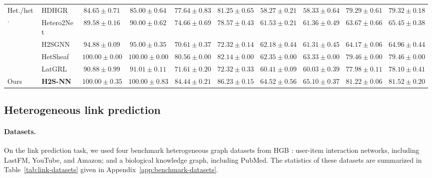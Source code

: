 \documentclass[sigconf,anonymous,review]{acmart}
\newcommand{\method}{\textsc{H2S-NN}}
\begin{document}
\begin{table}[t]
{\begin{tabular}{llcccccccc}
    \multirow{5}{*}{Het./het.}
    & HDHGR
    & $84.65 \pm 0.71$
    & $85.00 \pm 0.64$
    & $77.64 \pm 0.83$
    & $81.25 \pm 0.65$
    & $58.27 \pm 0.21$
    & $58.33 \pm 0.64$
    & $79.29 \pm 0.61$
    & $79.32 \pm 0.18$ \\

    & Hetero2Net
    & $89.58 \pm 0.16$
    & $90.00 \pm 0.62$
    & $74.66 \pm 0.69$
    & $78.57 \pm 0.43$
    & $61.53 \pm 0.21$
    & $61.36 \pm 0.49$
    & $63.67 \pm 0.66$
    & $65.45 \pm 0.38$ \\

    & H2SGNN
    & $94.88 \pm 0.09$
    & $95.00 \pm 0.35$
    & $70.61 \pm 0.37$
    & $72.32 \pm 0.14$
    & $62.18 \pm 0.44$
    & $61.31 \pm 0.45$
    & $64.17 \pm 0.06$
    & $64.96 \pm 0.44$ \\

    & HetSheaf
    & $\mathbf{100.00 \pm 0.00}$
    & $\mathbf{100.00 \pm 0.00}$
    & $80.56 \pm 0.00$
    & $82.14 \pm 0.00$
    & $62.35 \pm 0.00$
    & $63.33 \pm 0.00$
    & $79.46 \pm 0.00$
    & $79.46 \pm 0.00$ \\

    & LatGRL
    & $90.88 \pm 0.99$
    & $91.01 \pm 0.11$
    & $71.61 \pm 0.20$
    & $72.32 \pm 0.33$
    & $60.41 \pm 0.09$
    & $60.03 \pm 0.39$
    & $77.98 \pm 0.11$
    & $78.10 \pm 0.41$ \\
    \midrule

    Ours
    & \textbf{\method{}}
    & $\mathbf{100.00 \pm 0.35}$
    & $\mathbf{100.00 \pm 0.83}$
    & $\mathbf{84.44 \pm 0.21}$
    & $\mathbf{86.23 \pm 0.15}$
    & $\mathbf{64.52 \pm 0.56}$
    & $\mathbf{65.10 \pm 0.37}$
    & $\mathbf{81.22 \pm 0.06}$
    & $\mathbf{81.52 \pm 0.20}$ \\
    \bottomrule
  \end{tabular}%
  }
\end{table}



\subsection{Heterogeneous link prediction}
\label{sec:setup-link}

\paragraph{Datasets.}
On the link prediction task, we used four benchmark heterogeneous graph datasets from HGB \cite{lv2021hgb}: user-item interaction networks, including LastFM, YouTube, and Amazon; and a biological knowledge graph, including PubMed. The statistics of these datasets are summarized in Table~\ref{tab:link-datasets} given in Appendix~\ref{app:benchmark-datasets}.
\end{document}
